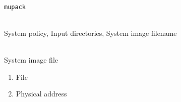\documentclass[a4paper,twoside,titlepage]{article}
\begin{document}
\begin{description} \itemsep1pt \parskip0pt
	\item[Name] \hfill \\
		\texttt{mupack}
	\item[Input] \hfill \\
		System policy, Input directories, System image filename
	\item[Output] \hfill \\
		System image file
	\item[Data] \hfill
		\begin{enumerate}
			\item File
			\item Physical address
		\end{enumerate}
\end{description}
\end{document}
